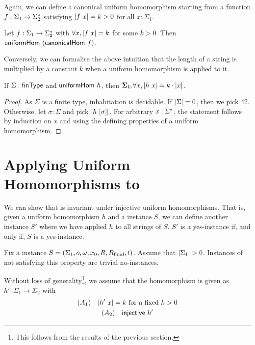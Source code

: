 Again, we can define a canonical uniform homomorphism starting from a function $f : \Sigma_1 \rightarrow \Sigma_2^*$ satisfying $|f~x| = k > 0$ for all $x : \Sigma_1$. 
\begin{proposition}
  Let $f : \Sigma_1 \rightarrow \Sigma_2^*$ with $\forall x, |f~x| = k$ for some $k > 0$. 
  Then $\textsf{uniformHom}~(\textsf{canonicalHom}~f)$. 
\end{proposition}

Conversely, we can formalise the above intuition that the length of a string is multiplied by a constant $k$ when a uniform homomorphism is applied to it.
\begin{lemma}
  If $\Sigma : \textsf{finType}$ and $\textsf{uniformHom}~h$, then $\bm{\Sigma}_{k}. \forall x, |h~x| = k \cdot |x|$. 
\end{lemma}
\begin{proof}
  As $\Sigma$ is a finite type, inhabitation is decidable. If $|\Sigma| = 0$, then we pick 42. 
  Otherwise, let $\sigma : \Sigma$ and pick $|h~[\sigma]|$. 
  For arbitrary $x : \Sigma^*$, the statement follows by induction on $x$ and using the defining properties of a uniform homomorphism.
\end{proof}

\section{Applying Uniform Homomorphisms to \PR{}}\label{sec:unif_hom_pr}
We can show that \PR{} is invariant under injective uniform homomorphisms. That is, given a uniform homomorphism $h$ and a \PR{} instance $S$, we can define another \PR{} instance $S'$ where we have applied $h$ to all strings of $S$. $S'$ is a yes-instance if, and only if, $S$ is a yes-instance. 

Fix a \PR{} instance $S = (\Sigma_1, o, \omega, x_0, R, R_{\text{final}}, t)$. 
Assume that $|\Sigma_1| > 0$. Instances of \PR{} not satisfying this property are trivial no-instances. 

Without loss of generality\footnote{This follows from the results of the previous section.}, we assume that the homomorphism is given as $h' : \Sigma_1 \rightarrow \Sigma_2$ with 
\begin{gather*}
  (A_1) \quad |h'~x| = k~\text{for a fixed } k > 0 \\
  (A_2) \quad \textsf{injective}~h'
\end{gather*}

